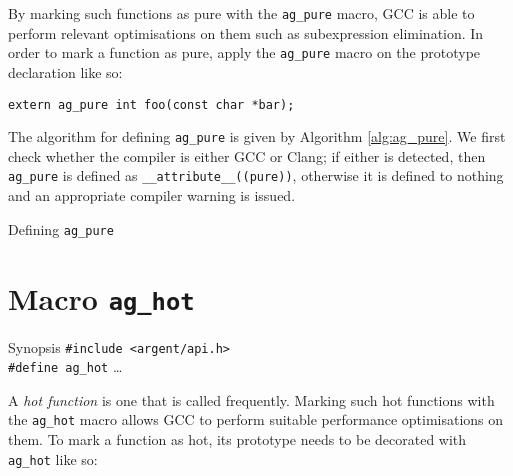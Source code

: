   By marking such functions as pure with the \texttt{ag\_pure} macro, GCC is able
  to perform relevant optimisations on them such as subexpression elimination. In
  order to mark a function as pure, apply the \texttt{ag\_pure} macro on the
  prototype declaration like so:

  \begin{lstlisting}[linewidth=1.0\linewidth, caption=Example use of ag\_pure]
    extern ag_pure int foo(const char *bar);
  \end{lstlisting}

  The algorithm for defining \verb|ag_pure| is given by Algorithm
  \ref{alg:ag_pure}. We first check whether the compiler is either GCC or Clang;
  if either is detected, then \verb|ag_pure| is defined as
  \verb|__attribute__((pure))|, otherwise it is defined to nothing and an
  appropriate compiler warning is issued.

  \begin{algorithm}
    \scriptsize
    \caption{Defining \texttt{ag\_pure}}
    \label{alg:ag_pure}
  \begin{algorithmic}
    \Else
    \EndIf
  \end{algorithmic}
  \end{algorithm}


%


\section{Macro \texttt{ag\_hot}}

\begin{bclogo}[logo=\bccrayon, noborder=true, barre=snake, couleurBarre=gray]
  {Synopsis}
  \small
  \verb|#include <argent/api.h>| \\
  \verb|#define ag_hot| \ldots
\end{bclogo}

A \emph{hot function} is one that is called frequently. Marking such hot
functions with the \verb|ag_hot| macro allows GCC to perform suitable
performance optimisations on them. To mark a function as hot, its prototype
needs to be decorated with \verb|ag_hot| like so:

